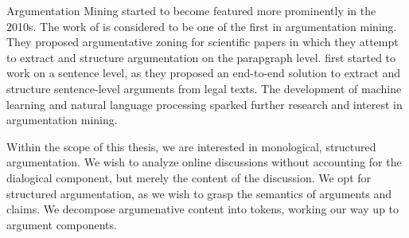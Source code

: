 Argumentation Mining started to become featured more prominently in the 2010s.
The work of \citet{teufel2009towards} is considered to be one of the first
in argumentation mining. They proposed argumentative zoning
for scientific papers in which they attempt to extract and structure
argumentation on the parapgraph level. 
\citet{palau2009argumentation} first started to work on a sentence level,
as they proposed an end-to-end solution to extract 
and structure sentence-level arguments from legal texts. The development of 
machine learning and natural language processing sparked 
further research and interest in argumentation mining. 

Within the scope of this thesis, 
we are interested in monological, structured argumentation.
We wish to analyze online discussions without accounting for the dialogical
component, but merely the content of the discussion. We opt for structured
argumentation, as we wish to grasp the semantics of arguments and claims. 
We decompose argumenative content into tokens, working our way up to argument
components. 


% 

